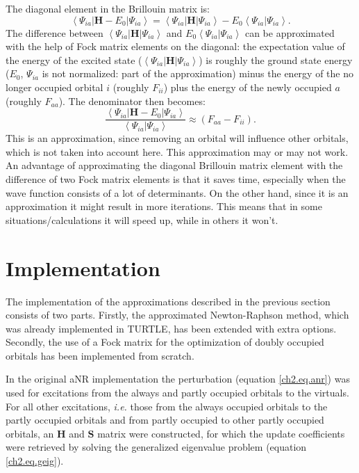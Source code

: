 The diagonal element in the Brillouin matrix is:
\begin{equation}
\left< \Psi_{ia} | \mathbf{H}-E_0 | \Psi_{ia} \right>  =  \left< \Psi_{ia} | \mathbf{H} | \Psi_{ia} \right>  - E_0 \left< \Psi_{ia} | \Psi_{ia} \right>.
\label{ch2.eq.brildiag}
\end{equation}
The difference between $\left < \Psi_{ia} | \mathbf{H} | \Psi_{ia} \right >$ and $E_0 \left< \Psi_{ia} | \Psi_{ia} \right>$ can be approximated with the help of Fock matrix elements on the diagonal:
the expectation value of the energy of the excited state ($\left< \Psi_{ia} | \mathbf{H} | \Psi_{ia} \right>$) is roughly the ground state energy ($E_0$, $\Psi_{ia}$ is not normalized: part of the approximation) minus the energy of the no longer occupied orbital $i$ (roughly $F_{ii}$) plus the energy of the newly occupied $a$ (roughly $F_{aa}$). The denominator then becomes:
\begin{equation}
\frac{\left< \Psi_{ia} | \mathbf{H}-E_0 | \Psi_{ia} \right>}{\left< \Psi_{ia} | \Psi_{ia} \right>} \approx (F_{aa}-F_{ii}).
\label{ch2.eq.cheapdiag}
\end{equation}
This is an approximation, since removing an orbital will influence other orbitals, which is not taken into account here. This approximation may or may not work. An advantage of approximating the diagonal Brillouin matrix element with the difference of two Fock matrix elements is that it saves time, especially when the wave function consists of a lot of determinants. On the other hand, since it is an approximation it might result in more iterations. This means that in some situations/calculations it will speed up, while in others it won't.

\section{\label{ch2.sec.implementation}Implementation}

The implementation of the approximations described in the previous section consists of two parts. Firstly, the approximated Newton-Raphson method, which was already implemented in TURTLE, has been extended with extra options. Secondly, the use of a Fock matrix for the optimization of doubly occupied orbitals has been implemented from scratch.

In the original aNR implementation the perturbation (equation \ref{ch2.eq.anr}) was used for excitations from the always and partly occupied orbitals to the virtuals. For all other excitations, \textit{i.e.} those from the always occupied orbitals to the partly occupied orbitals and from partly occupied to other partly occupied orbitals, an $\mathbf{H}$ and $\mathbf{S}$ matrix were constructed, for which the update coefficients were retrieved by solving the generalized eigenvalue problem (equation \ref{ch2.eq.geig}). 

